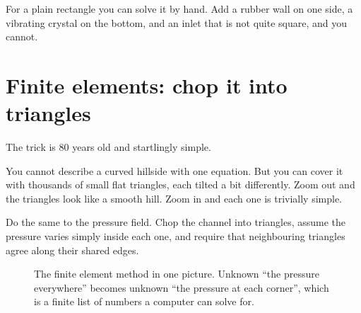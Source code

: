 \documentclass[11pt,a4paper]{article}
\begin{document}
For a plain rectangle you can solve it by hand. Add a rubber wall on one side, a
vibrating crystal on the bottom, and an inlet that is not quite square, and you
cannot.

\section{Finite elements: chop it into triangles}

The trick is 80 years old and startlingly simple.

\begin{analogy}
You cannot describe a curved hillside with one equation. But you can cover it
with thousands of small flat triangles, each tilted a bit differently. Zoom out
and the triangles look like a smooth hill. Zoom in and each one is trivially
simple.

Do the same to the pressure field. Chop the channel into triangles, assume the
pressure varies simply inside each one, and require that neighbouring triangles
agree along their shared edges.
\end{analogy}

\begin{figure}[h]
\centering
{}
\caption{The finite element method in one picture. Unknown ``the pressure
everywhere'' becomes unknown ``the pressure at each corner'', which is a finite
list of numbers a computer can solve for.}
\end{figure}
\end{document}
